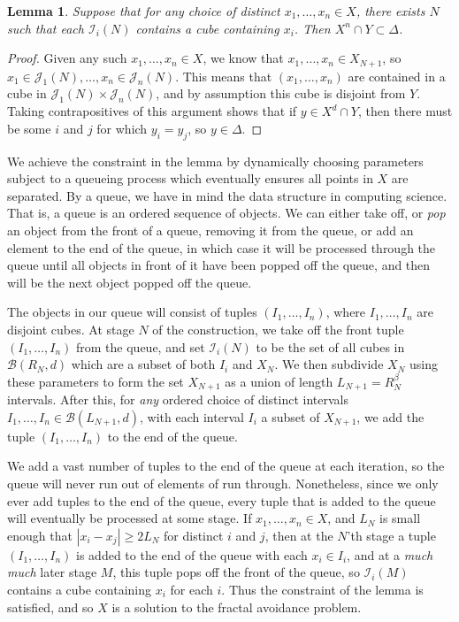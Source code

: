 \documentclass{article}
\theoremstyle{plain}
\newtheorem{lemma}{Lemma}
\theoremstyle{plain}
\begin{document}
\begin{multicols}{2}
\begin{lemma}
	Suppose that for any choice of distinct $x_1, \dots, x_n \in X$, there exists $N$ such that each $\mathcal{I}_i(N)$ contains a cube containing $x_i$. Then $X^n \cap Y \subset \Delta$.
\end{lemma}
\begin{proof}
	Given any such $x_1, \dots, x_n \in X$, we know that $x_1, \dots, x_n \in X_{N+1}$, so $x_1 \in \mathcal{J}_1(N), \dots, x_n \in \mathcal{J}_n(N)$. This means that $(x_1, \dots, x_n)$ are contained in a cube in $\mathcal{J}_1(N) \times \mathcal{J}_n(N)$, and by assumption this cube is disjoint from $Y$. Taking contrapositives of this argument shows that if $y \in X^d \cap Y$, then there must be some $i$ and $j$ for which $y_i = y_j$, so $y \in \Delta$.
\end{proof}


We achieve the constraint in the lemma by dynamically choosing parameters subject to a queueing process which eventually ensures all points in $X$ are separated. By a queue, we have in mind the data structure in computing science. That is, a queue is an ordered sequence of objects. We can either take off, or {\it pop} an object from the front of a queue, removing it from the queue, or add an element to the end of the queue, in which case it will be processed through the queue until all objects in front of it have been popped off the queue, and then will be the next object popped off the queue.

The objects in our queue will consist of tuples $(I_1, \dots, I_n)$, where $I_1 ,\dots, I_n$ are disjoint cubes. At stage $N$ of the construction, we take off the front tuple $(I_1, \dots, I_n)$ from the queue, and set $\mathcal{I}_i(N)$ to be the set of all cubes in $\mathcal{B}(R_N,d)$ which are a subset of both $I_i$ and $X_N$. We then subdivide $X_N$ using these parameters to form the set $X_{N+1}$ as a union of length $L_{N+1} = R_N^\beta$ intervals. After this, for {\it any} ordered choice of distinct intervals $I_1, \dots, I_n \in \mathcal{B}(L_{N+1},d)$, with each interval $I_i$ a subset of $X_{N+1}$, we add the tuple $(I_1, \dots, I_n)$ to the end of the queue.

We add a vast number of tuples to the end of the queue at each iteration, so the queue will never run out of elements of run through. Nonetheless, since we only ever add tuples to the end of the queue, every tuple that is added to the queue will eventually be processed at some stage. If $x_1, \dots, x_n \in X$, and $L_N$ is small enough that $|x_i - x_j| \geq 2L_N$ for distinct $i$ and $j$, then at the $N$'th stage a tuple $(I_1, \dots, I_n)$ is added to the end of the queue with each $x_i \in I_i$, and at a {\it much} {\it much} later stage $M$, this tuple pops off the front of the queue, so $\mathcal{I}_i(M)$ contains a cube containing $x_i$ for each $i$. Thus the constraint of the lemma is satisfied, and so $X$ is a solution to the fractal avoidance problem.


\end{multicols}
\end{document}

